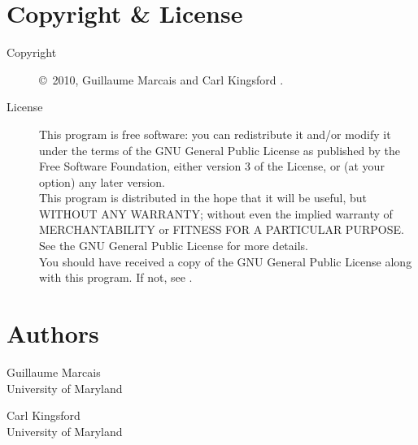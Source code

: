 \documentclass[english]{article}
\begin{document}
\section{Copyright \& License}
\begin{description}
\item[Copyright] \copyright\ 2010, Guillaume Marcais  and Carl Kingsford .

\item[License] This program is free software: you can redistribute it
  and/or modify it under the terms of the GNU General Public License
  as published by the Free Software Foundation, either version 3 of
  the License, or (at your option) any later version. \\
  This program is distributed in the hope that it will be useful, but
  WITHOUT ANY WARRANTY; without even the implied warranty of
  MERCHANTABILITY or FITNESS FOR A PARTICULAR PURPOSE.  See the GNU
  General Public License for more details. \\
  You should have received a copy of the GNU General Public License
  along with this program.  If not, see
  . 
\end{description}

\section{Authors}
\noindent
Guillaume Marcais \\
University of Maryland \\

\noindent
Carl Kingsford \\
University of Maryland \\

\LatexManEnd
\end{document}
